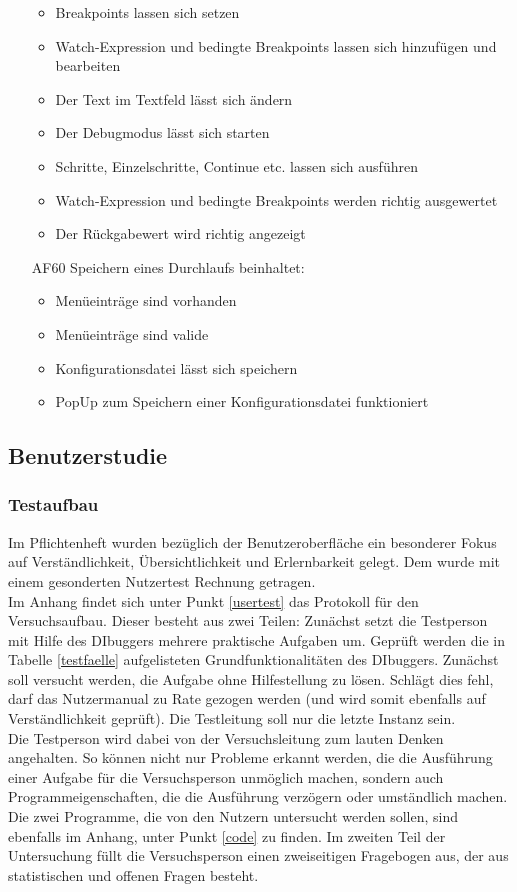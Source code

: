 \documentclass[parskip=full]{scrartcl}
\begin{document}
\begin{itemize}
\begin{itemize}
		\item Breakpoints lassen sich setzen
		\item Watch-Expression und bedingte Breakpoints lassen sich hinzufügen und bearbeiten
		\item Der Text im Textfeld lässt sich ändern
		\item Der Debugmodus lässt sich starten
		\item Schritte, Einzelschritte, Continue etc. lassen sich ausführen
		\item Watch-Expression und bedingte Breakpoints werden richtig ausgewertet
		\item Der Rückgabewert wird richtig angezeigt
	\end{itemize}
	\item[AF60] Speichern eines Durchlaufs beinhaltet:
	\begin{itemize}
		\item Menüeinträge sind vorhanden
		\item Menüeinträge sind valide
		\item Konfigurationsdatei lässt sich speichern
		\item PopUp zum Speichern einer Konfigurationsdatei funktioniert
	\end{itemize}
\end{itemize}

\subsection{Benutzerstudie}

\subsubsection{Testaufbau}

Im Pflichtenheft wurden bezüglich der Benutzeroberfläche ein besonderer Fokus auf Verständlichkeit, Übersichtlichkeit und Erlernbarkeit gelegt. Dem wurde mit einem gesonderten Nutzertest Rechnung getragen. \\
Im Anhang findet sich unter Punkt \ref{usertest} das Protokoll für den Versuchsaufbau. Dieser besteht aus zwei Teilen: Zunächst setzt die Testperson mit Hilfe des DIbuggers mehrere praktische Aufgaben um. Geprüft werden die in Tabelle \ref{testfaelle} aufgelisteten Grundfunktionalitäten des DIbuggers. Zunächst soll versucht werden, die Aufgabe ohne Hilfestellung zu lösen. Schlägt dies fehl, darf das Nutzermanual zu Rate gezogen werden (und wird somit ebenfalls auf Verständlichkeit geprüft). Die Testleitung soll nur die letzte Instanz sein. \\
Die Testperson wird dabei von der Versuchsleitung zum lauten Denken angehalten. So können nicht nur Probleme erkannt werden, die die Ausführung einer Aufgabe für die Versuchsperson unmöglich machen, sondern auch Programmeigenschaften, die die Ausführung verzögern oder umständlich machen. \\
Die zwei Programme, die von den Nutzern untersucht werden sollen, sind ebenfalls im Anhang, unter Punkt \ref{code} zu finden.
Im zweiten Teil der Untersuchung füllt die Versuchsperson einen zweiseitigen Fragebogen aus, der aus statistischen und offenen Fragen besteht.
\end{document}
